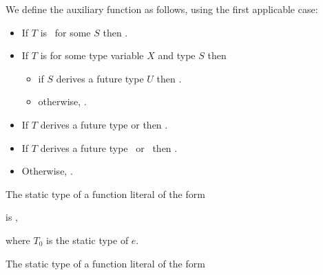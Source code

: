 \documentclass[makeidx]{article}
\begin{document}
{

\LMHash{}%
We define the auxiliary function
as follows, using the first applicable case:

\begin{itemize}
\item If $T$ is \ for some $S$
  then .

\item If $T$ is 
  for some type variable $X$ and type $S$ then
  \begin{itemize}
  \item if $S$ derives a future type $U$
    then .
  \item otherwise,
    .
  \end{itemize}

\item If $T$ derives a future type 
  or 
  then .

\item If $T$ derives a future type \ or
  \ then .

\item Otherwise, .
\end{itemize}


\LMHash{}%
The static type of a function literal of the form

\noindent
\code{<\TypeParametersStd>}

\noindent
{}

\noindent
is
,

\noindent
where $T_0$ is the static type of $e$.
\EndCase

\LMHash{}%
The static type of a function literal of the form

}
\end{document}

